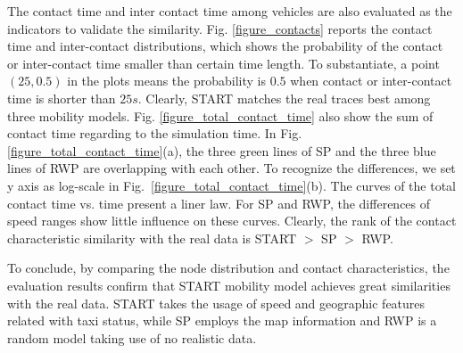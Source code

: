 The contact time and inter contact time among vehicles are also evaluated as the indicators to validate the similarity. 
Fig. \ref{figure_contacts} reports the contact time and inter-contact distributions, which shows the probability of the contact or inter-contact time smaller than certain time length. To substantiate, a point $(25,0.5)$ in the plots means the probability is $0.5$ when contact or inter-contact time is shorter than $25s$. Clearly, START matches the real traces best among three mobility models.
Fig. \ref{figure_total_contact_time} also show the sum of contact time regarding to the simulation time. In Fig. \ref{figure_total_contact_time}(a), the three green lines of SP and the three blue lines of RWP are overlapping with each other. To recognize the differences, we set y axis as log-scale in Fig.~\ref{figure_total_contact_time}(b). The curves of the total contact time vs. time present a liner law. For SP and RWP, the differences of speed ranges show little influence on these curves.
Clearly, the rank of the contact characteristic similarity with the real data is START $>$ SP $>$ RWP.

To conclude, by comparing the node distribution and contact characteristics, the evaluation results confirm that START mobility model achieves great similarities with the real data. START takes the usage of speed and geographic features related with taxi status, while SP employs the map information and RWP is a random model taking use of no realistic data.

